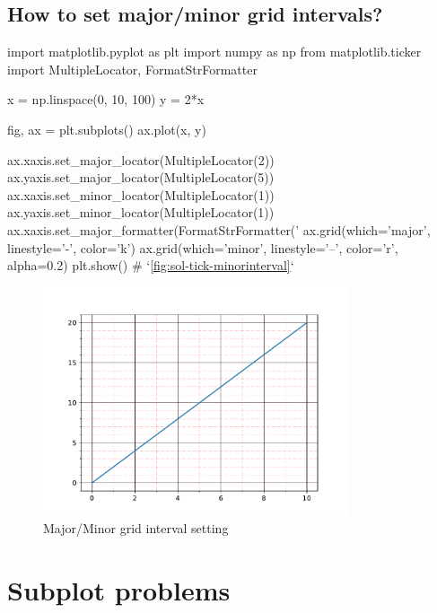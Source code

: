 \documentclass{report}
\begin{document}
\subsection{How to set major/minor grid intervals?}
\begin{py}
import matplotlib.pyplot as plt
import numpy as np
from matplotlib.ticker import MultipleLocator, FormatStrFormatter

x = np.linspace(0, 10, 100)
y = 2*x

fig, ax = plt.subplots()
ax.plot(x, y)

ax.xaxis.set_major_locator(MultipleLocator(2))
ax.yaxis.set_major_locator(MultipleLocator(5))
ax.xaxis.set_minor_locator(MultipleLocator(1))
ax.yaxis.set_minor_locator(MultipleLocator(1))
ax.xaxis.set_major_formatter(FormatStrFormatter('%
ax.grid(which='major', linestyle='-', color='k')
ax.grid(which='minor', linestyle='--', color='r', alpha=0.2)
plt.show() # `\autoref{fig:sol-tick-minorinterval}`
\end{py}

\begin{figure}[!htb]
  \centering
  \includegraphics[width=90mm]{sol-tick-minorinterval}
  \caption{Major/Minor grid interval setting}
  \label{fig:sol-tick-minorinterval}
\end{figure}

\section{Subplot problems}
\label{sec:advancedsubplot}

%
%

\appendix
\renewcommand{\chaptername}{Appendix}
\end{document}
